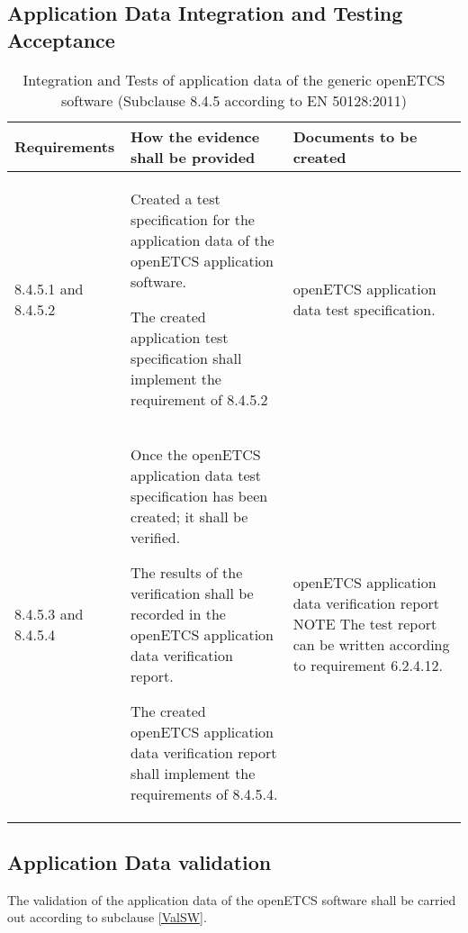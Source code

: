 \documentclass{template/openetcs_report}
\begin{document}
\subsection{Application Data Integration and Testing Acceptance}
{\footnotesize\sffamily\centering
\begin{longtable}{|p{2cm}|p{9cm}|p{3cm}|}
\caption{Integration and Tests of application data of the generic openETCS software (Subclause 8.4.5 according to EN 50128:2011)}\\
\hline
\bfseries Requirements & \bfseries How the evidence shall be provided & \bfseries Documents to be created\\
\hline
\hline
\endhead
\hline
\endfoot

8.4.5.1 and 8.4.5.2 & Created a test specification for the application data of the openETCS application software.

The created application test specification shall implement the requirement of 8.4.5.2
& openETCS application data test specification.\\ 
\hline
8.4.5.3 and 8.4.5.4 & Once the openETCS application data test specification has been created; it shall be verified.

The results of the verification shall be recorded in the openETCS application data verification report.

The created openETCS application data verification report shall implement the requirements of 8.4.5.4.
& openETCS application data verification report
\linebreak
\linebreak
NOTE\linebreak
The test report can be written according to requirement 6.2.4.12.\\ 
\hline
\end{longtable}}


\subsection{Application Data validation}
The validation of the application data of the openETCS software shall be carried out according to subclause \ref{ValSW}.
\end{document}
